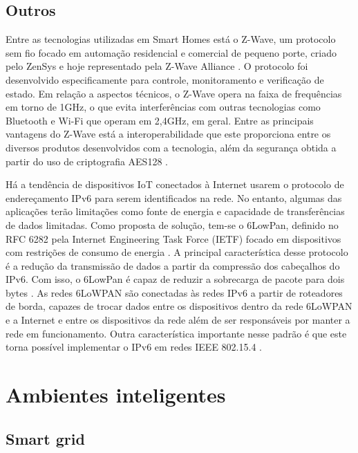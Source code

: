 \subsection{Outros}
Entre as tecnologias utilizadas em Smart Homes está o Z-Wave, um protocolo sem fio focado em automação residencial e comercial de pequeno porte, criado pelo ZenSys e hoje representado pela Z-Wave Alliance  \cite{Gomez2010}. O protocolo foi desenvolvido especificamente para controle, monitoramento e verificação de estado. Em relação a aspectos técnicos, o Z-Wave opera na faixa de frequências em torno de 1GHz, o que evita interferências com outras tecnologias como Bluetooth e Wi-Fi que operam em 2,4GHz, em geral. Entre as principais vantagens do Z-Wave está a interoperabilidade que este proporciona entre os diversos produtos desenvolvidos com a tecnologia, além da segurança obtida a partir do uso de criptografia AES128 \cite{Z-WaveAlliance2015}.

Há a tendência de dispositivos IoT conectados à Internet usarem o protocolo de endereçamento IPv6 para serem identificados na rede. No entanto, algumas das aplicações terão limitações como fonte de energia e capacidade de transferências de dados limitadas. Como proposta de solução, tem-se o 6LowPan, definido no RFC 6282 pela Internet Engineering Task Force (IETF) focado em dispositivos com restrições de consumo de energia \cite{Olsson2014}. A principal característica desse protocolo é a redução da transmissão de dados a partir da compressão dos cabeçalhos do IPv6. Com isso, o 6LowPan é capaz de reduzir a sobrecarga de pacote para dois bytes \cite{Al-Fuqaha2015}. As redes 6LoWPAN são conectadas às redes IPv6 a partir de roteadores de borda, capazes de trocar dados entre os dispositivos dentro da rede 6LoWPAN e a Internet e  entre os dispositivos da rede além de ser responsáveis por manter a rede em funcionamento. Outra característica importante nesse padrão é que este torna possível implementar o IPv6 em redes IEEE 802.15.4 \cite{Olsson2014}.

\section{Ambientes inteligentes}

\subsection{Smart grid}

